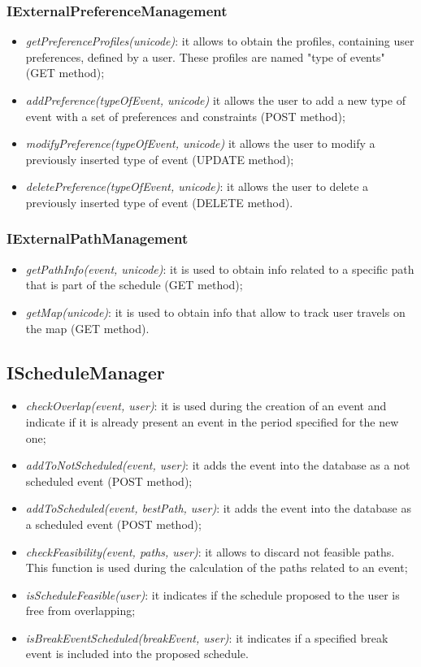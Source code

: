 \subsubsection{IExternalPreferenceManagement}
\begin{itemize}
\item \textit{getPreferenceProfiles(unicode)}: it allows to obtain the profiles, containing user preferences, defined by a user. These profiles are named "type of events" (GET method);
\item \textit{addPreference(typeOfEvent, unicode)} it allows the user to add a new type of event with a set of preferences and constraints (POST method);
\item \textit{modifyPreference(typeOfEvent, unicode)} it allows the user to modify a previously inserted type of event (UPDATE method);
\item \textit{deletePreference(typeOfEvent, unicode)}: it allows the user to delete a previously inserted type of event (DELETE method).
\end{itemize}
\subsubsection{IExternalPathManagement}
\begin{itemize}
\item \textit{getPathInfo(event, unicode)}: it is used to obtain info related to a specific path that is part of the schedule (GET method);
\item \textit{getMap(unicode)}: it is used to obtain info that allow to track user travels on the map (GET method).
\end{itemize}
\subsection{IScheduleManager}
\begin{itemize}
\item \textit{checkOverlap(event, user)}: it is used during the creation of an event and indicate if it is already present an event in the period specified for the new one;
\item \textit{addToNotScheduled(event, user)}: it adds the event into the database as a not scheduled event (POST method);
\item \textit{addToScheduled(event, bestPath, user)}: it adds the event into the database as a scheduled event (POST method);
\item \textit{checkFeasibility(event, paths, user)}: it allows to discard not feasible paths. This function is used during the calculation of the paths related to an event;
\item \textit{isScheduleFeasible(user)}: it indicates if the schedule proposed to the user is free from overlapping;
\item \textit{isBreakEventScheduled(breakEvent, user)}: it indicates if a specified break event is included into the proposed schedule.
\end{itemize}

